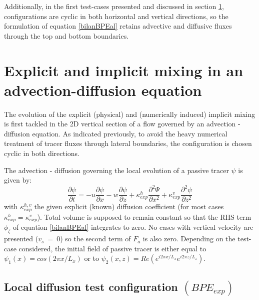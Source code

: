 Additionally, in the first test-cases presented and discussed in section \ref{section_numlab}, configurations are cyclic in both horizontal and vertical directions, so the formulation of equation \ref{bilanBPEal} retains advective and diffusive fluxes through the top and bottom boundaries.


\section{Explicit and implicit mixing in an advection-diffusion equation}
\label{section_numlab}
The evolution of the explicit (physical) and (numerically induced) implicit mixing is first tackled in the 2D vertical section of a flow governed by an advection - diffusion equation. As indicated previously, to avoid the heavy numerical treatment of tracer fluxes through lateral boundaries, the configuration is chosen cyclic in both directions.

The advection - diffusion governing the local evolution of a passive tracer $\psi$ is given by:
\begin{equation}
\frac{\partial \psi}{\partial t} = -u\frac{\partial \psi}{\partial x} - w\frac{\partial \psi}{\partial z} + \kappa_{exp}^h \frac{\partial^2 \Psi}{\partial x^2} + \kappa_{exp}^v \frac{\partial^2 \psi}{\partial z^2}
\label{eqAdvDiff}
\end{equation}
with $\kappa_{exp}^{h,v}$ the given explicit (known) diffusion coefficient (for most cases $\kappa_{exp}^{h}=\kappa_{exp}^{v}$).
Total volume is supposed to remain constant so that the RHS term $\phi_{\zeta}$ of equation \ref{bilanBPEal} integrates to zero. No cases with vertical velocity are presented ($v_s\ =\ 0$) so the second term of $F_a$ is also zero.
Depending on the test-case considered, the initial field of passive tracer is either equal to $\psi_1(x)=cos(2\pi x/L_x)$ or to $\psi_2(x,z)=Re(e^{i2\pi x/L_x}e^{i 2 \pi z/L_z})$.

\subsection{Local diffusion test configuration $(BPE_{exp})$}

